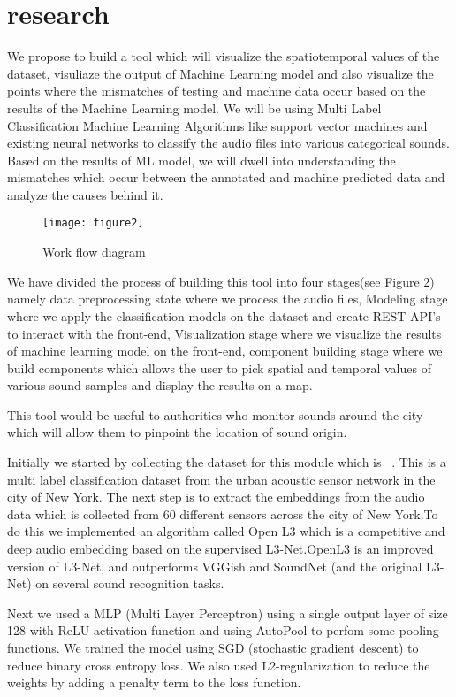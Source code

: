 	\section{research}
    We propose to build a tool which will visualize the spatiotemporal values of the dataset, visuliaze the output of Machine Learning model and also visualize the points where the mismatches of testing and machine data occur based on the results of the Machine Learning model. We will be using Multi Label Classification Machine Learning Algorithms like support vector machines and existing neural networks to classify the audio files into various categorical sounds. Based on the results of ML model, we will dwell into understanding the mismatches which occur between the annotated and machine predicted data and analyze the causes behind it. 
    
    	\begin{figure}[h!]
    	\texttt{[image: figure2]}
    	\caption{ Work flow diagram}
    \end{figure}
    
   
   	We have divided the process of building this tool into four stages(see Figure 2) namely data preprocessing state where we process the audio files, Modeling stage where we apply the classification models on the dataset and create REST API's to interact with the front-end, Visualization stage where we visualize the results of machine learning model on the front-end, component building stage where we build components which allows the user to pick spatial and temporal values of various sound samples and display the results on a map.
   	
    This tool would be useful to authorities who monitor sounds around the city which will allow them to pinpoint the location of sound origin.
    
    Initially we started by collecting the dataset for this module which is ~\cite{7}. This is a multi label classification dataset from the urban acoustic sensor network in the city of New York. The next step is to extract the embeddings from the audio data which is collected from 60 different sensors across the city of New York.To do this we implemented an algorithm called Open L3 which is a competitive and deep audio embedding based on the supervised L3-Net.OpenL3 is an improved version of L3-Net, and outperforms VGGish and SoundNet (and the original L3-Net) on several sound recognition tasks.
    
    Next we used a MLP (Multi Layer Perceptron) using a single output layer of size 128 with ReLU activation function and using AutoPool to perfom some pooling functions. We trained the model using SGD (stochastic gradient descent) to reduce binary cross entropy loss. We also used L2-regularization to reduce the weights by adding a penalty term to the loss function.
    
